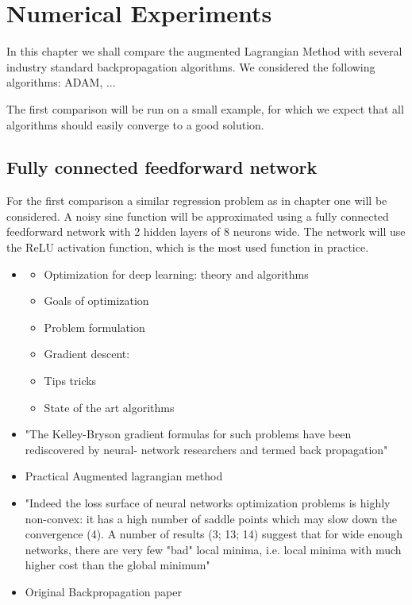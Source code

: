 \chapter{Numerical Experiments}
\label{cha:3}
In this chapter we shall compare the augmented Lagrangian Method with several industry standard backpropagation algorithms. We considered the following algorithms: ADAM, ...

The first comparison will be run on a small example, for which we expect that all algorithms should easily converge to a good solution.


\section{Fully connected feedforward network}
For the first comparison a similar regression problem as in chapter one will be considered. A noisy sine function will be approximated using a fully connected feedforward network with 2 hidden layers of 8 neurons wide. The network will use the ReLU activation function, which is the most used function in practice.




\begin{itemize}
\item
\cite{sun2019optimization}
\begin{itemize}
	\item Optimization for deep learning: theory and algorithms
	\item Goals of optimization
	\item Problem formulation
	\item Gradient descent:
	\item Tips  tricks
	\item State of the art algorithms
\end{itemize}


\item
\cite{dreyfus1990}

"The Kelley-Bryson gradient
formulas for such problems have been rediscovered by neural-
network researchers and termed back propagation"

\item
\cite{Birgin2009}

Practical Augmented lagrangian method

\item
\cite{jacot2020neural}
"Indeed
the loss surface of neural networks optimization problems is highly non-convex: it has a high number
of saddle points which may slow down the convergence (4). A number of results (3; 13; 14) suggest
that for wide enough networks, there are very few "bad" local minima, i.e. local minima with much
higher cost than the global minimum"
\item
\cite{Rumelhart1986}
Original Backpropagation paper


\end{itemize}

